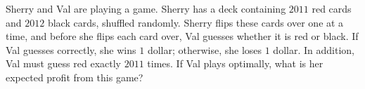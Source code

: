 Sherry and Val are playing a game. Sherry has a deck containing $2011$ red cards and $2012$ black cards, shuffled randomly. Sherry flips these cards over one at a time, and before she flips each card over, Val guesses whether it is red or black. If Val guesses correctly, she wins $1$ dollar; otherwise, she loses $1$ dollar. In addition, Val must guess red exactly $2011$ times. If Val plays optimally, what is her expected profit from this game?